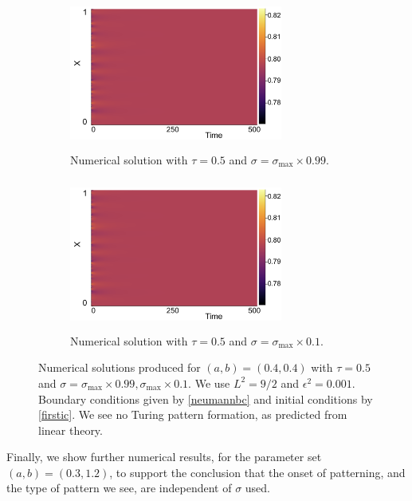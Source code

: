 \begin{figure}[H]
    \centering
    \begin{subfigure}[t]{0.45\textwidth}
        \centering
        \includegraphics[width=7cm,height=5cm]{linapp2.png}
        \caption{Numerical solution with $\tau=0.5$ and $\sigma=\sigma_{\max}\times0.99$.}
        \label{}
    \end{subfigure}
    \hfill
    \begin{subfigure}[t]{0.45\textwidth}
        \centering
        \includegraphics[width=7cm,height=5cm]{linapp2.png}
        \caption{Numerical solution with $\tau=0.5$ and $\sigma=\sigma_{\max}\times0.1$.}
        \label{}
    \end{subfigure}
    \caption{Numerical solutions produced for $(a,b)=(0.4,0.4)$ with $\tau=0.5$ and $\sigma=\sigma_{\max}\times0.99, \sigma_{\max}\times0.1$. We use $L^2=9/2$ and $\epsilon^2=0.001$. Boundary conditions given by \eqref{neumannbc} and initial conditions by \eqref{firstic}. We see no Turing pattern formation, as predicted from linear theory.}
    \label{fig:linapp2}
\end{figure}

Finally, we show further numerical results, for the parameter set $(a,b)=(0.3,1.2)$, to support the conclusion that the onset of patterning, and the type of pattern we see, are independent of $\sigma$ used.


